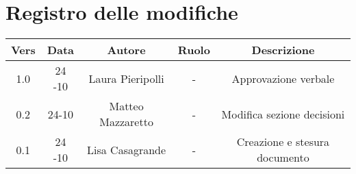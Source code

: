 \section{Registro delle modifiche}

\begin{table}[htbp]
	\begin{tabular}{|c|c|c|c|c|}
		\hline
		\rowcolor[gray]{0.9}
		Vers & Data & Autore & Ruolo & Descrizione \\
		\hline
		1.0 & 24 -10 & Laura Pieripolli & - & Approvazione verbale \\
		\hline
		0.2 & 24-10 & Matteo Mazzaretto & - & Modifica sezione decisioni \\
		\hline
		0.1 & 24 -10 & Lisa Casagrande & - & Creazione e stesura documento \\
		\hline
	\end{tabular}
\end{table}